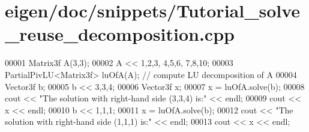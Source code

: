 \hypertarget{eigen_2doc_2snippets_2_tutorial__solve__reuse__decomposition_8cpp_source}{}\section{eigen/doc/snippets/\+Tutorial\+\_\+solve\+\_\+reuse\+\_\+decomposition.cpp}
\label{eigen_2doc_2snippets_2_tutorial__solve__reuse__decomposition_8cpp_source}

\begin{DoxyCode}
00001 Matrix3f A(3,3);
00002 A << 1,2,3,  4,5,6,  7,8,10;
00003 PartialPivLU<Matrix3f> luOfA(A); \textcolor{comment}{// compute LU decomposition of A}
00004 Vector3f b;
00005 b << 3,3,4;
00006 Vector3f x;
00007 x = luOfA.solve(b);
00008 cout << \textcolor{stringliteral}{"The solution with right-hand side (3,3,4) is:"} << endl;
00009 cout << x << endl;
00010 b << 1,1,1;
00011 x = luOfA.solve(b);
00012 cout << \textcolor{stringliteral}{"The solution with right-hand side (1,1,1) is:"} << endl;
00013 cout << x << endl;
\end{DoxyCode}
